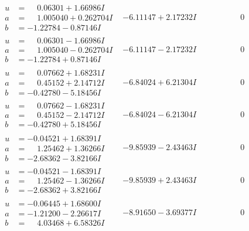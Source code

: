 \documentclass[1p]{elsarticle_modified}
\theoremstyle{definition}
\begin{document}
$$\begin{array}{c|c|c}
\begin{aligned}
u &= \phantom{-}0.06301 + 1.66986 I \\
a &= \phantom{-}1.005040 + 0.262704 I \\
b &= -1.22784 - 0.87146 I\end{aligned}
 & -6.11147 + 2.17232 I & \phantom{-0.000000 } 0 \\ \hline\begin{aligned}
u &= \phantom{-}0.06301 - 1.66986 I \\
a &= \phantom{-}1.005040 - 0.262704 I \\
b &= -1.22784 + 0.87146 I\end{aligned}
 & -6.11147 - 2.17232 I & \phantom{-0.000000 } 0 \\ \hline\begin{aligned}
u &= \phantom{-}0.07662 + 1.68231 I \\
a &= \phantom{-}0.45152 + 2.14712 I \\
b &= -0.42780 - 5.18456 I\end{aligned}
 & -6.84024 + 6.21304 I & \phantom{-0.000000 } 0 \\ \hline\begin{aligned}
u &= \phantom{-}0.07662 - 1.68231 I \\
a &= \phantom{-}0.45152 - 2.14712 I \\
b &= -0.42780 + 5.18456 I\end{aligned}
 & -6.84024 - 6.21304 I & \phantom{-0.000000 } 0 \\ \hline\begin{aligned}
u &= -0.04521 + 1.68391 I \\
a &= \phantom{-}1.25462 + 1.36266 I \\
b &= -2.68362 - 3.82166 I\end{aligned}
 & -9.85939 - 2.43463 I & \phantom{-0.000000 } 0 \\ \hline\begin{aligned}
u &= -0.04521 - 1.68391 I \\
a &= \phantom{-}1.25462 - 1.36266 I \\
b &= -2.68362 + 3.82166 I\end{aligned}
 & -9.85939 + 2.43463 I & \phantom{-0.000000 } 0 \\ \hline\begin{aligned}
u &= -0.06445 + 1.68600 I \\
a &= -1.21200 - 2.26617 I \\
b &= \phantom{-}4.03468 + 6.58326 I\end{aligned}
 & -8.91650 - 3.69377 I & \phantom{-0.000000 } 0\\

\end{array}$$
\end{document}
